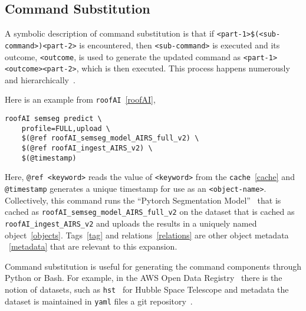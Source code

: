 \subsection{Command Substitution}
\label{command_substitution}

A symbolic description of command substitution is that if \texttt{<part-1>\$(<sub-command>)<part-2>} is encountered, then \texttt{<sub-command>} is executed and its outcome, \texttt{<outcome}, is used to generate the updated command as \texttt{<part-1><outcome><part-2>}, which is then executed. This process happens numerously and hierarchically~.

Here is an example from \texttt{roofAI}~\ref{roofAI},
%
\begin{verbatim}
roofAI semseg predict \
    profile=FULL,upload \
    $(@ref roofAI_semseg_model_AIRS_full_v2) \
    $(@ref roofAI_ingest_AIRS_v2) \
    $(@timestamp)
\end{verbatim}
%
Here, \texttt{@ref <keyword>} reads the value of \texttt{<keyword>} from the \texttt{cache}~\ref{cache} and \texttt{@timestamp} generates a unique timestamp for use as an \texttt{<object-name>}. Collectively, this command runs the \enquote{Pytorch Segmentation Model}~ that is cached as \texttt{roofAI\_semseg\_model\_AIRS\_full\_v2} on the dataset that is cached as \texttt{roofAI\_ingest\_AIRS\_v2} and uploads the results in a uniquely named object~\ref{objects}. Tags~\ref{tag} and relations~\ref{relations} are other object metadata ~\ref{metadata} that are relevant to this expansion.

Command substitution is useful for generating the command components through Python or Bash. For example, in the AWS Open Data Registry~ there is the notion of datasets, such as \texttt{hst}~ for Hubble Space Telescope and metadata the dataset is maintained in \texttt{yaml} files a git repository~. 

